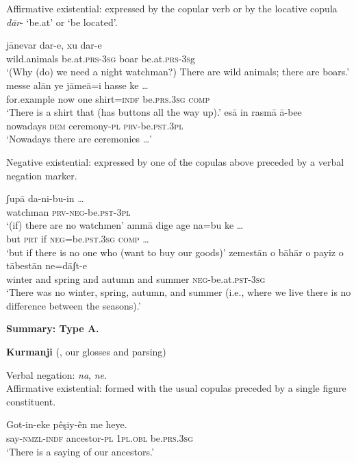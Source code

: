 \documentclass[output=paper]{langsci/langscibook}
\begin{document}
\begin{unindented}
Affirmative existential: expressed by the copular verb or by the locative copula \textit{dār}- `be.at' or `be located'.

\begin{exe}\ex \gll jānevar dar-e, xu    dar-e \\
wild.animals  be.at.\textsc{prs-3sg}   boar be.at.\textsc{prs-3s}g \\
    \glt `(Why (do) we need a night watchman?) There are wild animals; there are boars.' \parencite[84]{ShokriJahani2013}
\ex \gll messe alān  ye   jāmeā=i hasse ke … \\
for.example now  one shirt=\textsc{indf} be.\textsc{prs}.\textsc{3sg}    \textsc{comp} \\
    \glt `There is a shirt that (has buttons all the way up).'
\parencite[153]{ShokriJahani2013}
\ex \gll esā in rasmā ā-bee \\
nowadays \textsc{dem} ceremony-\textsc{pl} \textsc{prv}-be.\textsc{pst.3pl} \\
    \glt `Nowadays there are ceremonies …' \parencite[80]{ShokriJahani2013}
    \end{exe}

Negative existential: expressed by one of the copulas above preceded by a verbal negation marker.

\begin{exe}\ex \gll ʃupā da-ni-bu-in … \\
watchman \textsc{prv}-\textsc{neg}-be.\textsc{pst}-\textsc{3pl} \\
    \glt `(if) there are no watchmen' \parencite[84]{ShokriJahani2013}
\ex \gll ammā dige  age  na=bu ke … \\
but \textsc{prt} if \textsc{neg}=be.\textsc{pst}.\textsc{3sg} \textsc{comp}  … \\
    \glt `but if there is no one who (want to buy our goods)'
\parencite[82]{ShokriJahani2013}
\ex \gll zemestān o bāhār  o payiz o tābestān ne=dāʃt-e \\
winter and spring and autumn and summer \textsc{neg}-be.at.\textsc{pst-3sg}\\
    \glt `There was no winter, spring, autumn, and summer (i.e., where we live there is no difference between the seasons).' \parencite[65]{ShokriJahani2013}
    \end{exe} 

\textbf{Summary: Type A.}

\textbf{Kurmanji} (\citealt{Thackston2006}, our glosses and parsing)

Verbal negation: \textit{na}, \textit{ne}.\\
Affirmative existential: formed with the usual copulas preceded by a single figure constituent.
%
\begin{exe}\ex \gll Got-in-eke pêşiy-ên me heye.  \\
say-\textsc{nmzl}-\textsc{indf}   ancestor-\textsc{pl} \textsc{1pl}.\textsc{obl}   be.\textsc{prs.3sg} \\
    \glt `There is a saying of our ancestors.' \parencite[31]{Thackston2006}
    \end{exe} 


\end{unindented}
\end{document}
